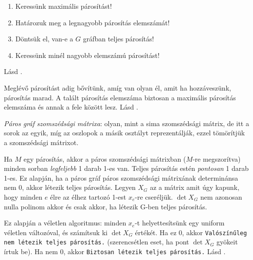 \documentclass[DIV=15,appendixprefix]{scrreprt}
\theoremstyle{definition}
\theoremstyle{remark}
\begin{document}
\begin{enumerate}
	\item Keressünk maximális párosítást!
	\item Határozuk meg a legnagyobb párosítás elemszámát!
	\item\label{itm:vanpar} Döntsük el, van-e a $G$ gráfban teljes párosítás!
	\item\label{itm:parkeres} Keressünk minél nagyobb elemszámú párosítást!
\end{enumerate}
%
Lásd
\cite[\href{http://www.math.u-szeged.hu/~hajnal/courses/MSc_Diszkret/MSc_kombi13/ea-parositasok.pdf}
{\emph{Párosítások I. -- Alapok, nem kombinatorikus módszerek}}, 2.~szakasz]{DiMat}.

Meglévő párosítást adig bővítünk, amíg van olyan él, amit ha hozzáveszünk, párosítás marad. A talált
párosítás elemszáma biztosan a maximális párosítás elemszáma és annak a fele között lesz.
%
Lásd
\cite[\href{http://www.math.u-szeged.hu/~hajnal/courses/MSc_Diszkret/MSc_kombi13/ea-parositasok.pdf}
{\emph{Párosítások I. -- Alapok, nem kombinatorikus módszerek}}, 3.~szakasz]{DiMat}.

\emph{Páros gráf szomszédsági mátrixa}: olyan, mint a sima szomszédsági mátrix, de itt a sorok az
egyik, míg az oszlopok a másik osztályt reprezentálják, ezzel tömörítjük a szomszédsági mátrixot.

Ha $M$ egy párosítás, akkor a páros szomszédsági mátrixban ($ M $-re megszorítva) minden sorban
\emph{legfeljebb} 1 darab 1-es van. Teljes párosítás estén \emph{pontosan} 1 darab 1-es. Ez alapján,
ha a páros gráf páros szomszédsági mátrixának determinánsa nem 0, akkor létezik teljes
párosítás.
%
Legyen $X_G$ az a mátrix amit úgy kapunk, hogy minden $e$ élre az élhez tartozó 1-est $x_e$-re
cseréljük. $ \det X_G $ nem azonosan nulla polinom akkor és csak akkor, ha létezik G-ben teljes
párosítás.

Ez alapján a véletlen algoritmus: minden $x_e$-t helyettesítsünk egy uniform véletlen változóval, és
számítsuk ki $ \det X_G $ értékét. Ha ez 0, akkor \texttt{Valószínűleg nem létezik teljes
párosítás.} (szerencsétlen eset, ha pont $ \det X_G $ gyökeit írtuk be). Ha nem 0, akkor
\texttt{Biztosan létezik teljes párosítás.}
%
Lásd
\cite[\href{http://www.math.u-szeged.hu/~hajnal/courses/MSc_Diszkret/MSc_kombi13/ea-Edmonds.pdf}
{\emph{Párosítások II. -- Kombinatorikus módszerek}}]{DiMat}.
\end{document}
